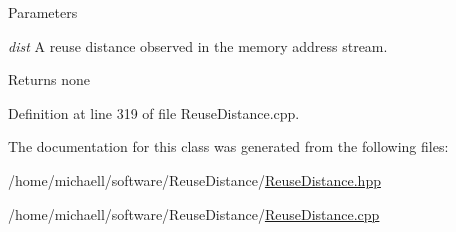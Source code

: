 \begin{DoxyParams}{Parameters}
\item[{\em dist}]A reuse distance observed in the memory address stream.\end{DoxyParams}
\begin{DoxyReturn}{Returns}
none 
\end{DoxyReturn}


Definition at line 319 of file ReuseDistance.cpp.



The documentation for this class was generated from the following files:\begin{DoxyCompactItemize}
\item 
/home/michaell/software/ReuseDistance/\hyperlink{_reuse_distance_8hpp}{ReuseDistance.hpp}\item 
/home/michaell/software/ReuseDistance/\hyperlink{_reuse_distance_8cpp}{ReuseDistance.cpp}\end{DoxyCompactItemize}
